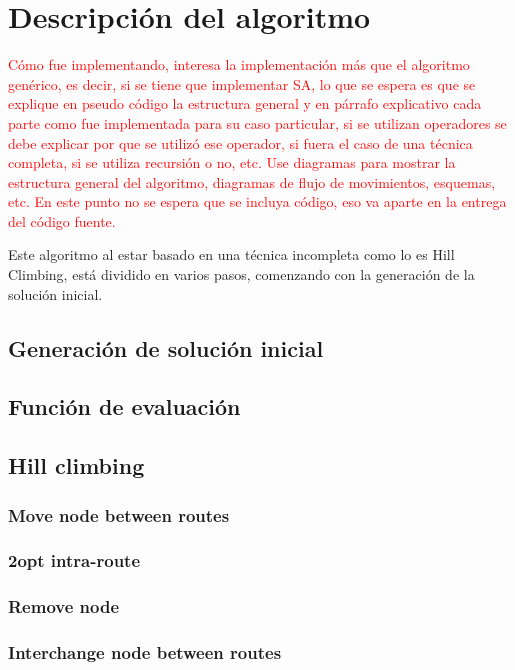 \section{Descripción del algoritmo}

\textcolor{red}{Cómo fue implementando, interesa la implementación más que el algoritmo genérico, es decir, si se tiene que implementar SA, lo que se espera es que se explique en pseudo código la estructura general y en párrafo explicativo cada parte como fue implementada para su caso particular, si se utilizan operadores se debe explicar por que se utilizó ese operador, si fuera el caso de una técnica completa, si se utiliza recursión o no, etc. Use diagramas para mostrar la estructura general del algoritmo, diagramas de flujo de movimientos, esquemas, etc. En este punto no se espera que se incluya código, eso va aparte en la entrega del código fuente.}

Este algoritmo al estar basado en una técnica incompleta como lo es Hill Climbing, está dividido en varios pasos, comenzando con la generación de la solución inicial.

\subsection{Generación de solución inicial}



\subsection{Función de evaluación}



\subsection{Hill climbing}




\subsubsection{Move node between routes}


\subsubsection{2opt intra-route}


\subsubsection{Remove node}


\subsubsection{Interchange node between routes}

